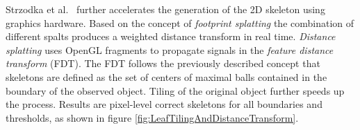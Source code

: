 Strzodka et al.~\cite{strzodka2004generalized} further accelerates the generation of the 2D skeleton using graphics hardware. Based on the concept of \emph{footprint splatting} the combination of different spalts produces a weighted distance transform in real time. \emph{Distance splatting} uses OpenGL fragments to propagate signals in the \emph{feature distance transform} (FDT). The FDT follows the previously described concept that skeletons are defined as the set of centers of maximal balls contained in the boundary of the observed object. Tiling of the original object further speeds up the process. Results are pixel-level correct skeletons for all boundaries and thresholds, as shown in figure \ref{fig:LeafTilingAndDistanceTransform}.


